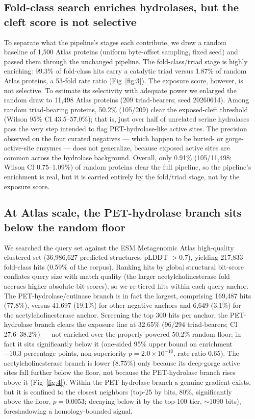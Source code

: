 \documentclass[10pt]{article}
\newcommand{\sm}{\ensuremath{\sim}}
\begin{document}
\subsection{Fold-class search enriches hydrolases, but the cleft score is not selective}
To separate what the pipeline's stages each contribute, we drew a random baseline of 1,500 Atlas proteins (uniform byte-offset sampling, fixed seed) and passed them through the unchanged pipeline. The fold-class/triad stage is highly enriching: 99.3\% of fold-class hits carry a catalytic triad versus 1.87\% of random Atlas proteins, a 53-fold rate ratio (Fig~\ref{fig:3}). The exposure score, however, is not selective. To estimate its selectivity with adequate power we enlarged the random draw to 11{,}498 Atlas proteins (209 triad-bearers; seed 20260614). Among random triad-bearing proteins, 50.2\% (105/209) clear the exposed-cleft threshold (Wilson 95\% CI 43.5--57.0\%); that is, just over half of unrelated serine hydrolases pass the very step intended to flag PET-hydrolase-like active sites. The precision observed on the four curated negatives --- which happen to be buried- or gorge-active-site enzymes --- does not generalize, because exposed active sites are common across the hydrolase background. Overall, only 0.91\% (105/11{,}498; Wilson CI 0.75--1.09\%) of random proteins clear the full pipeline, so the pipeline's enrichment is real, but it is carried entirely by the fold/triad stage, not by the exposure score.

\subsection{At Atlas scale, the PET-hydrolase branch sits below the random floor}
We searched the query set against the ESM Metagenomic Atlas high-quality clustered set (36,986,627 predicted structures, pLDDT $> 0.7$), yielding 217,833 fold-class hits (0.59\% of the corpus). Ranking hits by global structural bit-score conflates query size with match quality (the larger acetylcholinesterase fold accrues higher absolute bit-scores), so we re-tiered hits within each query anchor. The PET-hydrolase/cutinase branch is in fact the largest, comprising 169,487 hits (77.8\%), versus 41,697 (19.1\%) for other-negative anchors and 6,649 (3.1\%) for the acetylcholinesterase anchor. Screening the top 300 hits per anchor, the PET-hydrolase branch clears the exposure line at 32.65\% (96/294 triad-bearers; CI 27.6--38.2\%) --- not enriched over the properly powered 50.2\% random floor; in fact it sits significantly below it (one-sided 95\% upper bound on enrichment $-10.3$ percentage points, non-superiority $p = 2.0\times10^{-10}$, rate ratio 0.65). The acetylcholinesterase branch is lower (8.75\%) only because its deep-gorge active sites fall further below the floor, not because the PET-hydrolase branch rises above it (Fig~\ref{fig:4}). Within the PET-hydrolase branch a genuine gradient exists, but it is confined to the closest neighbors (top-25 by bits, 80\%, significantly above the floor, $p = 0.0053$; decaying below it by the top-100 tier, \sm1090 bits), foreshadowing a homology-bounded signal.
\end{document}
